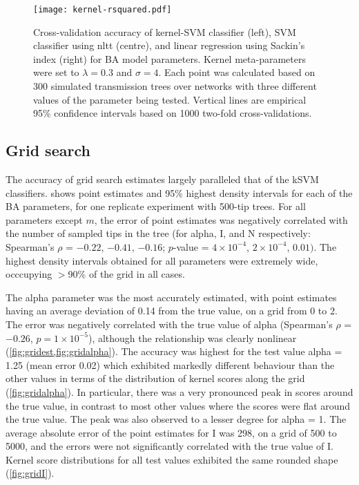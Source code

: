 \begin{figure}[ht]
  \centering
  \texttt{[image: kernel-rsquared.pdf]}
  \caption{
      Cross-validation accuracy of kernel-SVM classifier (left), SVM classifier
      using \gls{nltt} (centre), and linear regression using Sackin's index
      (right) for \gls{BA} model parameters. Kernel meta-parameters were set to
      $\lambda = 0.3$ and $\sigma = 4$. Each point was calculated based on 300
      simulated transmission trees over networks with three different values of
      the parameter being tested. Vertical lines are empirical 95\% confidence
      intervals based on 1000 two-fold cross-validations.
  }
  \label{fig:rsquared}
\end{figure}

\subsection{Grid search}




The accuracy of grid search estimates largely paralleled that of the \gls{kSVM}
classifiers.  shows point estimates and 95\% highest density
intervals for each of the \gls{BA} parameters, for one replicate experiment
with 500-tip trees. For all parameters except $m$, the error of point estimates
was negatively correlated with the number of sampled tips in the tree (for
\gls{alpha}, \gls{I}, and \gls{N} respectively: Spearman's $\rho$ = 
    \ensuremath{-0.22},
    \ensuremath{-0.41},
    \ensuremath{-0.16};
$p$-value = 
    $4\!\times\!10^{-4}$,
    $2\!\times\!10^{-4}$,
    $0.01)$.
The highest density intervals obtained for all parameters were extremely wide,
occcupying $>$90\% of the grid in all cases. 

The \gls{alpha} parameter was the most accurately estimated, with point
estimates having an average deviation of 
    0.14
from the true value, on a grid from 0 to 2. The error was negatively correlated
with the true value of \gls{alpha} 
    (Spearman's $\rho$ = \ensuremath{-0.26},
     $p = 1\!\times\!10^{-5}$),
although the relationship was clearly nonlinear (\cref{fig:gridest,fig:gridalpha}).
The accuracy was highest for the test value \gls{alpha} = 1.25
    (mean error 0.02)
which exhibited markedly different behaviour than the other values in terms of
the distribution of kernel scores along the grid (\cref{fig:gridalpha}). In
particular, there was a very pronounced peak in scores around the true value,
in contrast to most other values where the scores were flat around the true
value. The peak was also observed to a lesser degree for \gls{alpha} = 1. The
average absolute error of the point estimates for \gls{I} was 
    298,
on a grid of 500 to 5000, and the errors were not significantly correlated with
the true value of \gls{I}. Kernel score distributions for all test values
exhibited the same rounded shape (\cref{fig:gridI}). 

